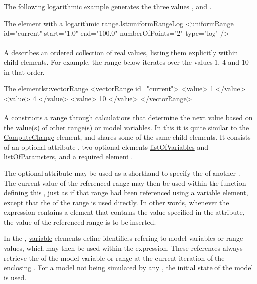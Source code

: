 The following logarithmic example generates the three values ,  and .
\begin{myXmlLst}{The  element with a logarithmic range.}{lst:uniformRangeLog}
    <uniformRange id="current" start="1.0" end="100.0" numberOfPoints="2" type="log" />
\end{myXmlLst}

\paragraph{}
\label{class:vectorRange}
A  describes an ordered collection of real values, listing them explicitly within child  elements.
For example, the range below iterates over the values $1$, $4$ and $10$ in that order.
\begin{myXmlLst}{The  element}{lst:vectorRange}
    <vectorRange id="current"> 
        <value> 1 </value> 
        <value> 4 </value> 
        <value> 10 </value> 
    </vectorRange> 
\end{myXmlLst}

\paragraph{}
\label{class:functionalRange}
A  constructs a range through calculations that determine the next value based on the value(s) of other range(s) or model variables.
In this it is quite similar to the \hyperref[class:computeChange]{ComputeChange} element, and shares some of the same child elements.
It consists of an optional attribute , two optional elements \hyperref[sec:listOfVariables]{listOfVariables} and \hyperref[sec:listOfParameters]{listOfParameters}, and a required element .

The optional attribute  may be used as a shorthand to specify the  of another .
The current value of the referenced range may then be used within the function defining this , just as if that range had been referenced using a \hyperref[class:variable]{variable} element, except that the  of the range is used directly.
In other words, whenever the expression contains a  element that contains the value specified in the  attribute, the value of the referenced range is to be inserted.

In the , \hyperref[class:variable]{variable} elements define identifiers refering to model variables or range values, which may then be used within the  expression.
These references always retrieve the  of the model variable or range at the current iteration of the enclosing .
For a model not being simulated by any , the initial state of the model is used.


